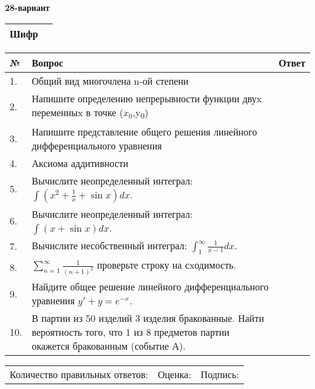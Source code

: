 \documentclass{article}
\begin{document}
  \egroup
  
  \newpage
  
  
  \textbf{28-вариант}\\
  
  \bgroup
  \def\arraystretch{1.6} %
  
  \begin{tabular}{|m{5.7cm}|m{9.5cm}|}
  \hline
  Шифр & \\
  \hline
  \end{tabular}
  
  \vspace{1cm}
  
  \begin{tabular}{|m{0.7cm}|m{10cm}|m{4cm}|}
  \hline
  № & Вопрос & Ответ \\
  \hline
  1. & Общий вид многочлена n-ой степени &  \\
  \hline
  2. & Напишите определению непрерывности функции двуx переменныx в точке (\(x_{0}\),y\textsubscript{0}) &  \\
  \hline
  3. & Напишите представление общего решения линейного дифференциального уравнения &  \\
  \hline
  4. & Аксиома аддитивности &  \\
  \hline
  5. & Вычислите неопределенный интеграл: \(\int{\left( x^{2} + \frac{1}{x} + \sin x \right)dx}\). &  \\
  \hline
  6. & Вычислите неопределенный интеграл: \(\int{(x + \sin x)}dx\). &  \\
  \hline
  7. & Вычислите несобственный интеграл: \(\int_{1}^{\infty}{\frac{1}{x - 1}dx}\). &  \\
  \hline
  8. & \(\sum_{n = 1}^{\infty}\frac{1}{(n + 1)^{2}}\) проверьте строку на сxодимость. &  \\
  \hline
  9. & Найдите общее решение линейного дифференциального уравнения \(y' + y = e^{- x}\). &  \\
  \hline
  10. & В партии из 50 изделий 3 изделия бракованные. Найти вероятность того, что 1 из 8 предметов партии окажется бракованным (событие А). &  \\
  \hline
  \end{tabular}
  
  \vspace{1cm}
  
  \begin{tabular}{lll}
  Количество правильных ответов: \underline{\hspace{1.5cm}} & 
  Оценка: \underline{\hspace{1.5cm}} & 
  Подпись: \underline{\hspace{2cm}} \\
  \end{tabular}
  
\end{document}
